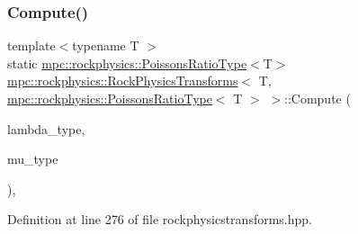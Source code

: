 \subsubsection{\texorpdfstring{Compute()}{Compute()}\hspace{0.1cm}{\footnotesize\ttfamily [1/6]}}
{\footnotesize\ttfamily template$<$typename T $>$ \\
static \mbox{\hyperlink{structmpc_1_1rockphysics_1_1_poissons_ratio_type}{mpc\+::rockphysics\+::\+Poissons\+Ratio\+Type}}$<$T$>$ \mbox{\hyperlink{structmpc_1_1rockphysics_1_1_rock_physics_transforms}{mpc\+::rockphysics\+::\+Rock\+Physics\+Transforms}}$<$ T, \mbox{\hyperlink{structmpc_1_1rockphysics_1_1_poissons_ratio_type}{mpc\+::rockphysics\+::\+Poissons\+Ratio\+Type}}$<$ T $>$ $>$\+::Compute (\begin{DoxyParamCaption}\item[{const \mbox{\hyperlink{structmpc_1_1rockphysics_1_1_lame_paramter_modulus_type}{mpc\+::rockphysics\+::\+Lame\+Paramter\+Modulus\+Type}}$<$ T $>$ \&}]{lambda\+\_\+type,  }\item[{const \mbox{\hyperlink{structmpc_1_1rockphysics_1_1_shear_modulus_type}{mpc\+::rockphysics\+::\+Shear\+Modulus\+Type}}$<$ T $>$ \&}]{mu\+\_\+type }\end{DoxyParamCaption})\hspace{0.3cm}{\ttfamily [inline]}, {\ttfamily [static]}}



Definition at line 276 of file rockphysicstransforms.\+hpp.

\mbox{\label{structmpc_1_1rockphysics_1_1_rock_physics_transforms_3_01_t_00_01mpc_1_1rockphysics_1_1_poissons_ratio_type_3_01_t_01_4_01_4_a54e5b7e680bc85c4c5506924ba7d2962}} 
